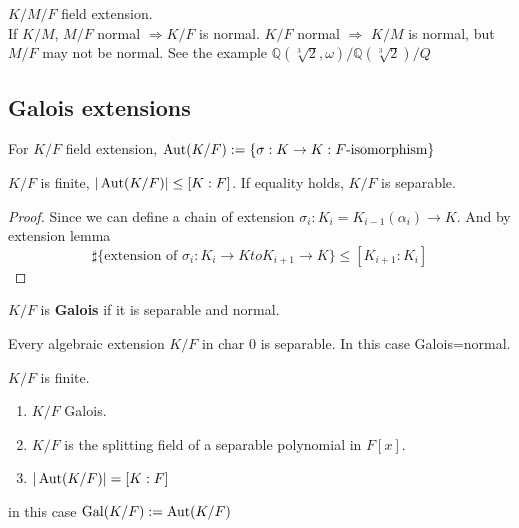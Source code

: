 \begin{corollary}
     $ K/M/F  $ field extension.\\
     If  $ K/M  $,  $ M/F $ normal  $ \Rightarrow K/F $ is normal.  $ K/F  $ normal  $ \Rightarrow $  $ K/M $   is normal, but  $ M/F  $ may not be normal. See the example  $ \mathbb{Q}(\sqrt[3]{2},\omega)/\mathbb{Q}(\sqrt[3]{2})/Q $ 
\end{corollary}
\subsection{Galois extensions}
For  $ K/F  $ field extension,  $ \operatorname{Aut}(K/F):=\{\sigma:K\rightarrow K: \text{$ F $-isomorphism}\} $
\begin{lemma}\label{lemma for Galois extension}
     $ K/F  $ is finite,  $ |\operatorname{Aut}(K/F)| \leq [K:F] $. If equality holds,  $ K/F  $ is separable.
\end{lemma}
\begin{proof}
    Since we can define a chain of extension  $ \sigma_i:K_i=K_{i-1}(\alpha_i)\rightarrow K $. And by extension lemma 
    \[\sharp \{\text{extension of }\sigma_i:K_i\rightarrow K to K_{i+1}\rightarrow K\} \leq [K_{i+1}:K_i]\] 
\end{proof}
\begin{definition}
     $ K/F $ is \textbf{Galois} if it is separable and normal. 
\end{definition}
\begin{note}
    Every algebraic extension  $ K/F  $ in char 0 is separable. In this case Galois=normal.
\end{note}
\begin{theorem}
    $ K/F $ is finite. 
   \begin{enumerate}[(1)]
        \item  $ K/F  $ Galois.
        \item  $ K/F $ is the splitting field of a separable polynomial in  $ F[x] $.
        \item  $ |\operatorname{Aut}(K/F)|=[K:F] $   
   \end{enumerate}
   in this case  $ \operatorname{Gal}(K/F):=\operatorname{Aut}(K/F) $ 
\end{theorem}
